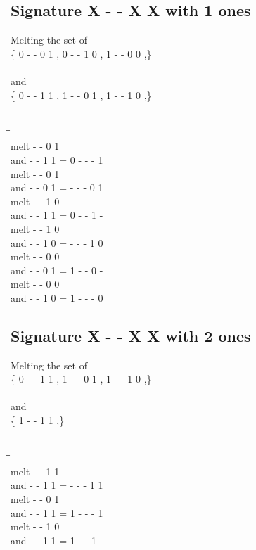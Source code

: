 \documentclass{article}
\begin{document}
\subsection{Signature X - - X X with 1 ones}
Melting the set of\\
\{ 0  -  -  0  1 , 0  -  -  1  0 , 1  -  -  0  0 ,\}\\\\
and\\
\{ 0  -  -  1  1 , 1  -  -  0  1 , 1  -  -  1  0 ,\}\\\\
\begin{tabbing}
\hspace{3cm}\=\hspace{3cm}\=\hspace{3cm}\\[1cm]
melt  -  -  0  1 \\
and  -  -  1  1 \>
 =  0  -  -  -  1 \\[1mm]
melt  -  -  0  1 \\
and  -  -  0  1 \>
 =  -  -  -  0  1 \\[1mm]
melt  -  -  1  0 \\
and  -  -  1  1 \>
 =  0  -  -  1  - \\[1mm]
melt  -  -  1  0 \\
and  -  -  1  0 \>
 =  -  -  -  1  0 \\[1mm]
melt  -  -  0  0 \\
and  -  -  0  1 \>
 =  1  -  -  0  - \\[1mm]
melt  -  -  0  0 \\
and  -  -  1  0 \>
 =  1  -  -  -  0 \\[1mm]
\end{tabbing}
\newpage
\subsection{Signature X - - X X with 2 ones}
Melting the set of\\
\{ 0  -  -  1  1 , 1  -  -  0  1 , 1  -  -  1  0 ,\}\\\\
and\\
\{ 1  -  -  1  1 ,\}\\\\
\begin{tabbing}
\hspace{3cm}\=\hspace{3cm}\=\hspace{3cm}\\[1cm]
melt  -  -  1  1 \\
and  -  -  1  1 \>
 =  -  -  -  1  1 \\[1mm]
melt  -  -  0  1 \\
and  -  -  1  1 \>
 =  1  -  -  -  1 \\[1mm]
melt  -  -  1  0 \\
and  -  -  1  1 \>
 =  1  -  -  1  - \\[1mm]
\end{tabbing}
\newpage
\end{document}
